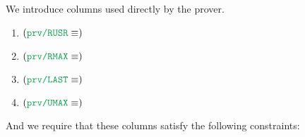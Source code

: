 \def\proverColA {\loc{prv\separator{}UMAX}}
\def\proverColB {\loc{prv\separator{}RUSR}}
\def\proverColC {\loc{prv\separator{}RMAX}}
\def\proverColD {\loc{prv\separator{}LAST}}
We introduce columns used directly by the prover.
\begin{enumerate}
        \item $(\proverColB \equiv)$ \proverColumnRelativeUserTransactionNumber    {}
        \item $(\proverColC \equiv)$ \proverColumnRelativeUserTransactionNumberMax {}
        \item $(\proverColD \equiv)$ \proverColumnIsLastUserTransactionOfBlock     {}
        \item $(\proverColA \equiv)$ \proverColumnUserTransactionNumberMax         {}
\end{enumerate}
And we require that these columns satisfy the following constraints:
